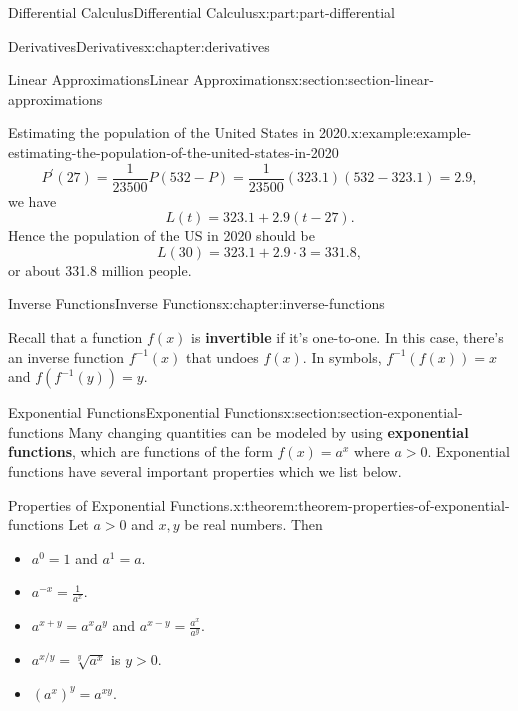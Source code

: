 \documentclass[twoside,10pt,]{tufte-book}
\newcommand{\terminology}[1]{\textbf{#1}}
\numberwithin{equation}{part}
\begin{document}
\begin{partptx}{Differential Calculus}{}{Differential Calculus}{}{}{x:part:part-differential}
\begin{chapterptx}{Derivatives}{}{Derivatives}{}{}{x:chapter:derivatives}
\begin{sectionptx}{Linear Approximations}{}{Linear Approximations}{}{}{x:section:section-linear-approximations}
\begin{example}{Estimating the population of the United States in 2020.}{x:example:example-estimating-the-population-of-the-united-states-in-2020}
\begin{equation*}
P^\prime(27) = \frac{1}{23500}P(532-P) = \frac{1}{23500}(323.1)(532-323.1) = 2.9,
\end{equation*}
we have%
\begin{equation*}
L(t) = 323.1 + 2.9(t-27).
\end{equation*}
Hence the population of the US in 2020 should be%
\begin{equation*}
L(30) = 323.1 + 2.9\cdot3 = 331.8,
\end{equation*}
or about 331.8 million people.%
\end{example}
\end{sectionptx}
\end{chapterptx}
%
\typeout{************************************************}
\typeout{************************************************}
%
\begin{chapterptx}{Inverse Functions}{}{Inverse Functions}{}{}{x:chapter:inverse-functions}
\begin{introduction}{}%
Recall that a function \(f(x)\) is \terminology{invertible} if it's one-to-one. In this case, there's an inverse function \(f^{-1}(x)\) that undoes \(f(x)\). In symbols, \(f^{-1}(f(x)) = x\) and \(f(f^{-1}(y)) = y\).%
\end{introduction}%
%
%
\typeout{************************************************}
\typeout{************************************************}
%
\begin{sectionptx}{Exponential Functions}{}{Exponential Functions}{}{}{x:section:section-exponential-functions}
Many changing quantities can be modeled by using \terminology{exponential functions}, which are functions of the form \(f(x) = a^{x}\) where \(a > 0\). Exponential functions have several important properties which we list below.%
\begin{theorem}{Properties of Exponential Functions.}{}{x:theorem:theorem-properties-of-exponential-functions}%
%
Let \(a > 0\) and \(x,y\) be real numbers. Then%
\begin{itemize}[label=\textbullet]
\item{}\(a^{0} = 1\) and \(a^{1} = a\).%
\item{}\(a^{-x} = \frac{1}{a^{x}}\).%
\item{}\(a^{x+y} = a^{x}a^{y}\) and \(a^{x-y} = \frac{a^{x}}{a^{y}}\).%
\item{}\(a^{x/y} = \sqrt[y]{a^{x}}\) is \(y > 0\).%
\item{}\((a^{x})^{y} = a^{xy}\).%

\end{itemize}
\end{theorem}
\end{sectionptx}
\end{chapterptx}
\end{partptx}
\end{document}
